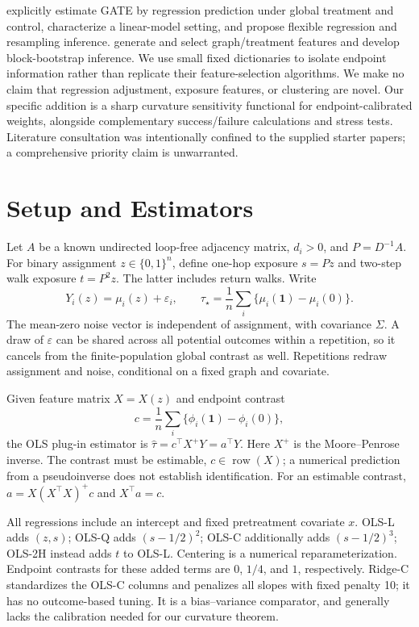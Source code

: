 \documentclass{article}
\newcommand{\one}{\mathbf 1}
\newcommand{\gate}{\tau_\star}
\begin{document}
\citet{chin2019} explicitly estimate GATE by regression prediction under global treatment and control, characterize a linear-model setting, and propose flexible regression and resampling inference. \citet{han2023} generate and select graph/treatment features and develop block-bootstrap inference. We use small fixed dictionaries to isolate endpoint information rather than replicate their feature-selection algorithms. We make no claim that regression adjustment, exposure features, or clustering are novel. Our specific addition is a sharp curvature sensitivity functional for endpoint-calibrated weights, alongside complementary success/failure calculations and stress tests. Literature consultation was intentionally confined to the supplied starter papers; a comprehensive priority claim is unwarranted.

\section{Setup and Estimators}
Let $A$ be a known undirected loop-free adjacency matrix, $d_i>0$, and $P=D^{-1}A$. For binary assignment $z\in\{0,1\}^n$, define one-hop exposure $s=Pz$ and two-step walk exposure $t=P^2z$. The latter includes return walks. Write
\begin{equation}
Y_i(z)=\mu_i(z)+\varepsilon_i,\qquad
\gate=\frac1n\sum_i\{\mu_i(\one)-\mu_i(0)\}.
\label{eq:target}
\end{equation}
The mean-zero noise vector is independent of assignment, with covariance $\Sigma$. A draw of $\varepsilon$ can be shared across all potential outcomes within a repetition, so it cancels from the finite-population global contrast as well. Repetitions redraw assignment and noise, conditional on a fixed graph and covariate.

Given feature matrix $X=X(z)$ and endpoint contrast
\begin{equation}
c=\frac1n\sum_i\{\phi_i(\one)-\phi_i(0)\},
\end{equation}
the OLS plug-in estimator is $\widehat\tau=c^\top X^+Y=a^\top Y$. Here $X^+$ is the Moore--Penrose inverse. The contrast must be estimable, $c\in\operatorname{row}(X)$; a numerical prediction from a pseudoinverse does not establish identification. For an estimable contrast, $a=X(X^\top X)^+c$ and $X^\top a=c$.

All regressions include an intercept and fixed pretreatment covariate $x$. OLS-L adds $(z,s)$; OLS-Q adds $(s-1/2)^2$; OLS-C additionally adds $(s-1/2)^3$; OLS-2H instead adds $t$ to OLS-L. Centering is a numerical reparameterization. Endpoint contrasts for these added terms are $0$, $1/4$, and $1$, respectively. Ridge-C standardizes the OLS-C columns and penalizes all slopes with fixed penalty 10; it has no outcome-based tuning. It is a bias--variance comparator, and generally lacks the calibration needed for our curvature theorem.
\end{document}
